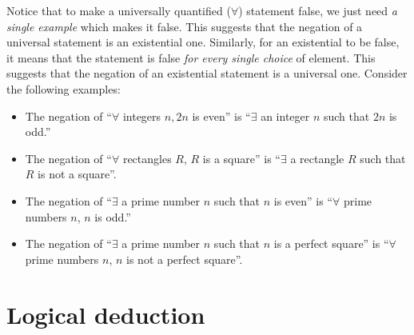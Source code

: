 \documentclass{tufte-book}
\begin{document}
Notice that to make a universally quantified ($\forall$) statement false, we just need \emph{a single example} which makes it false. This suggests that the negation of a universal statement is an existential one. Similarly, for an existential to be false, it means that the statement is false \emph{for every single choice} of element. This suggests that the negation of an existential statement is a universal one. Consider the following examples: 
\begin{itemize}
    \item The negation of ``$\forall$ integers $n, 2n$ is even'' is ``$\exists$ an integer $n$ such that $2n$ is odd.''
    \item The negation of ``$\forall$ rectangles $R$, $R$ is a square'' is ``$\exists$ a rectangle $R$ such that $R$ is not a square''.
    \item The negation of ``$\exists$ a prime number $n$ such that $n$ is even'' is ``$\forall$ prime numbers $n$, $n$ is odd.''
    \item The negation of ``$\exists$ a prime number $n$ such that $n$ is a perfect square'' is ``$\forall$ prime numbers $n$, $n$ is not a perfect square''.
\end{itemize}

\section{Logical deduction}
\label{sec:logical-deduction}
\end{document}
